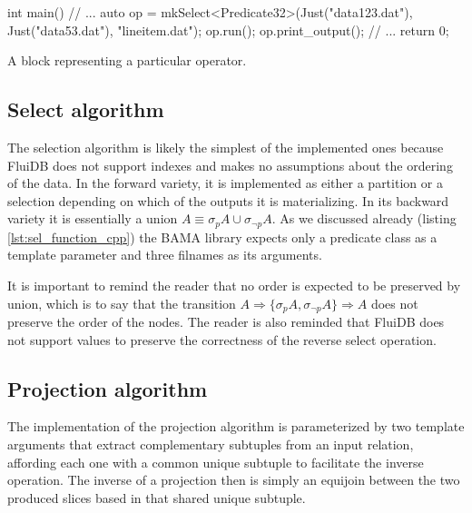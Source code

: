 \begin{code}
\begin{cppcode}
int main() {
  // ...
  {
    auto op = mkSelect<Predicate32>(Just("data123.dat"), Just("data53.dat"),
                                    "lineitem.dat");
    op.run();
    op.print_output();
  }
  // ...
  return 0;
}
\end{cppcode}
  \caption{\label{lst:gen_out_code}A block representing a particular
    operator.}
\end{code}


\subsection{Select algorithm}

The selection algorithm is likely the simplest of the implemented ones
because FluiDB does not support indexes and makes no assumptions about
the ordering of the data. In the forward variety, it is implemented as
either a partition or a selection depending on which of the outputs it
is materializing. In its backward variety it is essentially a union
\(A \equiv \sigma_p A \cup \sigma_{\neg p} A\). As we discussed
already (listing \ref{lst:sel_function_cpp}) the BAMA library expects
only a predicate class as a template parameter and three filnames as
its arguments.

It is important to remind the reader that no order is expected to be
preserved by union, which is to say that the transition \(A
\Rightarrow \{\sigma_p A, \sigma_{\neg p} A\} \Rightarrow A\) does not
preserve the order of the nodes. The reader is also reminded that
FluiDB does not support  values to preserve the correctness of
the reverse select operation.


\subsection{Projection algorithm}
\label{sec:projection_algorithm}

The implementation of the projection algorithm is parameterized by two
template arguments that extract complementary subtuples from an input
relation, affording each one with a common unique subtuple to
facilitate the inverse operation. The inverse of a projection then is
simply an equijoin between the two produced slices based in that
shared unique subtuple.

